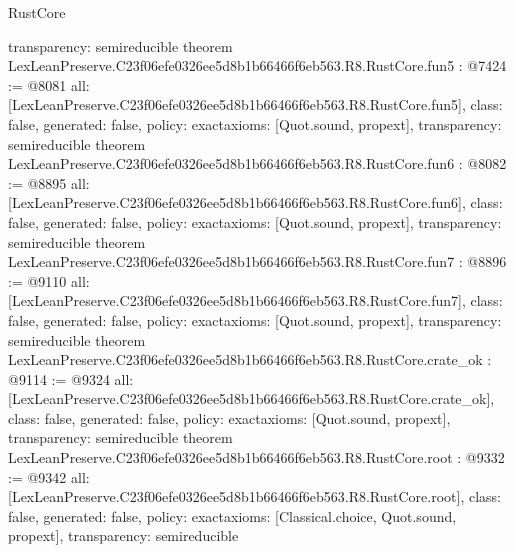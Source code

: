 \begin{lexlean}{RustCore}
\begin{coremodule}
{  transparency: semireducible
}
theorem LexLeanPreserve.C23f06efe0326ee5d8b1b66466f6eb563.R8.RustCore.fun5 : @7424 := @8081 {
  all: [LexLeanPreserve.C23f06efe0326ee5d8b1b66466f6eb563.R8.RustCore.fun5],
  class: false,
  generated: false,
  policy: exact{axioms: [Quot.sound, propext]},
  transparency: semireducible
}
theorem LexLeanPreserve.C23f06efe0326ee5d8b1b66466f6eb563.R8.RustCore.fun6 : @8082 := @8895 {
  all: [LexLeanPreserve.C23f06efe0326ee5d8b1b66466f6eb563.R8.RustCore.fun6],
  class: false,
  generated: false,
  policy: exact{axioms: [Quot.sound, propext]},
  transparency: semireducible
}
theorem LexLeanPreserve.C23f06efe0326ee5d8b1b66466f6eb563.R8.RustCore.fun7 : @8896 := @9110 {
  all: [LexLeanPreserve.C23f06efe0326ee5d8b1b66466f6eb563.R8.RustCore.fun7],
  class: false,
  generated: false,
  policy: exact{axioms: [Quot.sound, propext]},
  transparency: semireducible
}
theorem LexLeanPreserve.C23f06efe0326ee5d8b1b66466f6eb563.R8.RustCore.crate_ok : @9114 := @9324 {
  all: [LexLeanPreserve.C23f06efe0326ee5d8b1b66466f6eb563.R8.RustCore.crate_ok],
  class: false,
  generated: false,
  policy: exact{axioms: [Quot.sound, propext]},
  transparency: semireducible
}
theorem LexLeanPreserve.C23f06efe0326ee5d8b1b66466f6eb563.R8.RustCore.root : @9332 := @9342 {
  all: [LexLeanPreserve.C23f06efe0326ee5d8b1b66466f6eb563.R8.RustCore.root],
  class: false,
  generated: false,
  policy: exact{axioms: [Classical.choice, Quot.sound, propext]},
  transparency: semireducible
}


\end{coremodule}
\end{lexlean}
